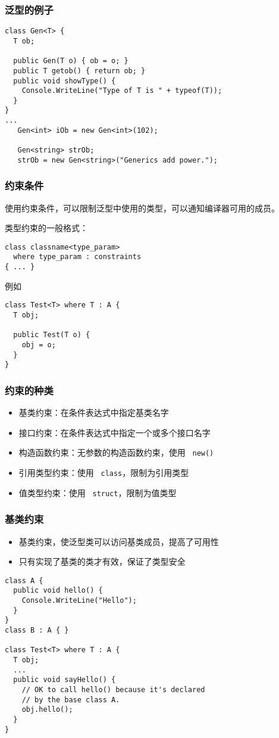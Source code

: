 \begin{frame}[fragile]
\frametitle{泛型的例子}
\begin{lstlisting}
class Gen<T> {
  T ob;

  public Gen(T o) { ob = o; }
  public T getob() { return ob; }
  public void showType() {
    Console.WriteLine("Type of T is " + typeof(T));
  }
}
...
   Gen<int> iOb = new Gen<int>(102);

   Gen<string> strOb;
   strOb = new Gen<string>("Generics add power.");
\end{lstlisting}
\end{frame}


\begin{frame}[fragile]
\frametitle{约束条件}

\CJKindent 使用约束条件，可以限制泛型中使用的类型，可以通知编译器可用的成员。

类型约束的一般格式：
\begin{lstlisting}
class classname<type_param>
  where type_param : constraints
{ ... }
\end{lstlisting}
例如
\begin{lstlisting}
class Test<T> where T : A {
  T obj;

  public Test(T o) {
    obj = o;
  }
}
\end{lstlisting}

\end{frame}


\begin{frame}[fragile]
\frametitle{约束的种类}
\begin{itemize}
\setlength{\itemsep}{8pt plus 1pt}
\item 基类约束：在条件表达式中指定基类名字
\item 接口约束：在条件表达式中指定一个或多个接口名字
\item 构造函数约束：无参数的构造函数约束，使用 ~\texttt{new()}
\item 引用类型约束：使用 ~\texttt{class}，限制为引用类型
\item 值类型约束：使用 ~\texttt{struct}，限制为值类型
\end{itemize}

\end{frame}


\begin{frame}[fragile]
\frametitle{基类约束}
\begin{itemize}
\item 基类约束，使泛型类可以访问基类成员，提高了可用性
\item 只有实现了基类的类才有效，保证了类型安全
\end{itemize}
\begin{lstlisting}
class A {
  public void hello() {
    Console.WriteLine("Hello");
  }
}
class B : A { }

class Test<T> where T : A {
  T obj;
  ...
  public void sayHello() {
    // OK to call hello() because it's declared
    // by the base class A.
    obj.hello();
  }
}

\end{lstlisting}
\end{frame}


